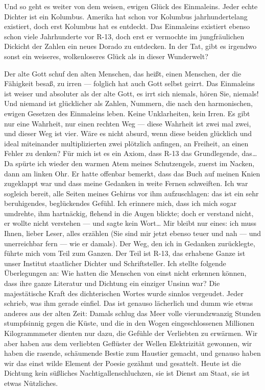 Und so geht es weiter von dem weisen, ewigen Glück des Einmaleins.
Jeder echte Dichter ist ein Kolumbus. Amerika hat schon vor
Kolumbus jahrhundertelang existiert, doch erst Kolumbus hat es
entdeckt. Das Einmaleins existiert ebenso schon viele Jahrhunderte
vor R-13, doch erst er vermochte im jungfräulichen Dickicht der
Zahlen ein neues Dorado zu entdecken. In der Tat, gibt es irgendwo
sonst ein weiseres, wolkenloseres Glück als in dieser Wunderwelt?

Der alte Gott schuf den alten Menschen, das heißt, einen Menschen,
der die Fähigkeit besaß, zu irren — folglich hat auch Gott selbst
geirrt. Das Einmaleins ist weiser und absoluter als der alte Gott,
es irrt sich niemals, hören Sie, niemals! Und niemand ist
glücklicher als Zahlen, Nummern, die nach den harmonischen, ewigen
Gesetzen des Einmaleins leben. Keine Unklarheiten, kein Irren. Es
gibt nur eine Wahrheit, nur einen rechten Weg — diese Wahrheit ist
zwei mal zwei, und dieser Weg ist vier. Wäre es nicht absurd, wenn
diese beiden glücklich und ideal miteinander multiplizierten zwei
plötzlich anfingen, an Freiheit, an einen Fehler zu denken? Für
mich ist es ein Axiom, dass R-13 das Grundlegende, das\ldots{} Da spürte
ich wieder den warmen Atem meines Schutzengels, zuerst im Nacken,
dann am linken Ohr. Er hatte offenbar bemerkt, dass das Buch auf
meinen Knien zugeklappt war und dass meine Gedanken in weite Fernen
schweiften. Ich war sogleich bereit, alle Seiten meines Gehirns vor
ihm aufzuschlagen: das ist ein sehr beruhigendes, beglückendes
Gefühl. Ich erinnere mich, dass ich mich sogar umdrehte, ihm
hartnäckig, flehend in die Augen blickte; doch er verstand nicht,
er wollte nicht verstehen — und sagte kein Wort\ldots{} Mir bleibt nur
eines: ich muss Ihnen, lieber Leser, alles erzählen (Sie sind mir
jetzt ebenso teuer und nah — und unerreichbar fern — wie er
damals). Der Weg, den ich in Gedanken zurücklegte, führte mich
vom Teil zum Ganzen. Der Teil ist R-13, das erhabene Ganze ist
unser Institut staatlicher Dichter und Schriftsteller. Ich stellte
folgende Überlegungen an: Wie hatten die Menschen von einst nicht
erkennen können, dass ihre ganze Literatur und Dichtung ein
einziger Unsinn war? Die majestätische Kraft des dichterischen
Wortes wurde sinnlos vergeudet. Jeder schrieb, was ihm gerade
einfiel. Das ist genauso lächerlich und dumm wie etwas anderes aus
der alten Zeit: Damals schlug das Meer volle vierundzwanzig Stunden
stumpfsinnig gegen die Küste, und die in den Wogen eingeschlossenen
Millionen Kilogrammmeter dienten nur dazu, die Gefühle der
Verliebten zu erwärmen. Wir aber haben aus dem verliebten Geflüster
der Wellen Elektrizität gewonnen, wir haben die rasende, schäumende
Bestie zum Haustier gemacht, und genauso haben wir das einst wilde
Element der Poesie gezähmt und gesattelt. Heute ist die Dichtung
kein süßliches Nachtigallenschluchzen, sie ist Dienst am Staat, sie
ist etwas Nützliches.

